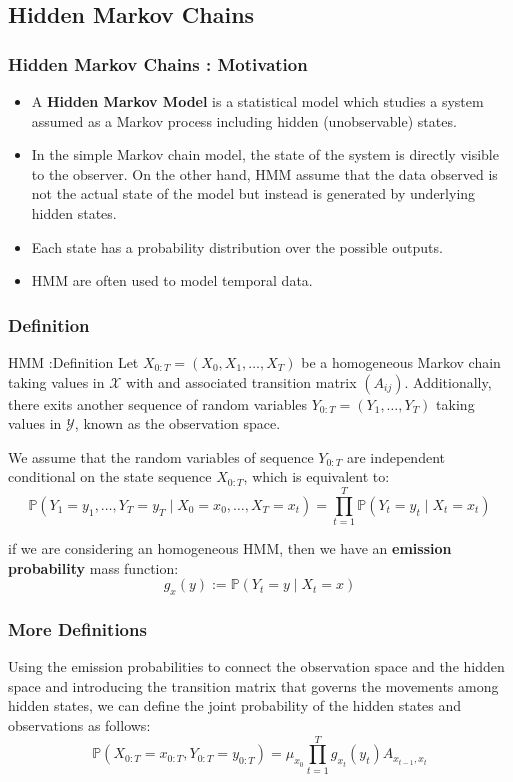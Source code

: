 \documentclass[xcolor=dvipsnames, compress]{beamer}
\begin{document}
\begin{frame}
\section{Hidden Markov Chains }
\frametitle{Hidden Markov Chains : Motivation}
\begin{itemize}
	\item A  \textbf{Hidden Markov Model} is a statistical model which studies a system assumed as a Markov process including hidden (unobservable) states. 
	\item In the simple Markov chain model, the state of the system is directly visible to the observer. On the other hand, HMM assume that the data observed is not the actual state of the model but instead is generated by underlying hidden states.
	\item Each state has a probability distribution over the possible outputs. 
	\item HMM are often used to model temporal data.
\end{itemize}
\end{frame}

\begin{frame}
\frametitle{Definition}
\begin{block}{HMM :Definition}
	Let $X_{0:T}=\left(X_{0},X_{1},\ldots,X_{T}\right)$ be a homogeneous Markov chain taking values in $\mathcal{X}$ with and associated transition matrix $\left(A_{ij}\right)$. Additionally, there exits another sequence of random variables $Y_{0:T}=\left(Y_{1},\ldots,Y_{T}\right)$ taking values in $\mathcal{Y}$, known as the observation space. 
\end{block}	

We assume that the random variables of sequence $Y_{0:T}$ are independent conditional on the state sequence $X_{0:T}$, which is equivalent to:
\begin{equation*}
\mathds{P}\left(Y_{1}=y_{1},\ldots,Y_{T}=y_{T}\mid X_{0}=x_{0},\ldots,X_{T}=x_{t}\right)=\prod_{t=1}^{T}\mathds{P}\left(Y_{t}=y_{t}\mid X_{t}=x_{t}\right)
\end{equation*}	
	
if we are considering an homogeneous HMM, then we have an  \textbf{emission probability} mass function:
\begin{equation*}
g_{x}(y):=\mathds{P}\left(Y_{t}=y\mid X_{t}=x\right)
\end{equation*}	
\end{frame}

\begin{frame}
\frametitle{More Definitions}
Using the emission probabilities to connect the observation space and the hidden space and introducing the transition matrix that governs the movements among hidden states, we can define the  joint probability of the hidden states and observations as follows:
\begin{equation*}
\mathds{P}\left(X_{0:T}=x_{0:T},Y_{0:T}=y_{0:T}\right)=\mu_{x_{0}}\prod_{t=1}^{T}g_{x_{t}}\left(y_{t}\right)A_{x_{t-1},x_{t}}
\end{equation*}	
\end{frame}
\end{document}

